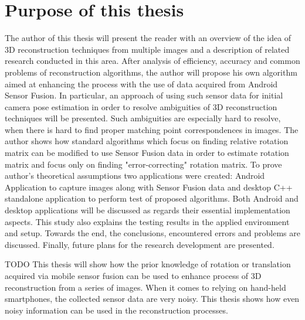 \section{Purpose of this thesis} %
The author of this thesis will present the reader with an overview of the idea of 3D reconstruction techniques from multiple images and a description of related research conducted in this area. After analysis of efficiency, accuracy and common problems of reconstruction algorithms, the author will propose his own algorithm aimed at enhancing the process with the use of data acquired from Android Sensor Fusion. In particular, an approach of using such sensor data for initial camera pose estimation in order to resolve ambiguities of 3D reconstruction techniques will be presented. Such ambiguities are especially hard to resolve, when there is hard to find proper matching point correspondences in images. The author shows how standard algorithms which focus on finding relative rotation matrix can be modified to use Sensor Fusion data in order to estimate rotation matrix and focus only on finding "error-correcting" rotation matrix. To prove author's theoretical assumptions two applications were created: Android Application to capture images along with Sensor Fusion data and desktop C++ standalone application to perform test of proposed algorithms. Both Android and desktop applications will be discussed as regards their essential implementation aspects. This study also explains the testing results in the applied environment and setup. Towards the end, the conclusions, encountered errors and problems are discussed. Finally, future plans for the research development are presented.

TODO 
This thesis will show how the prior knowledge of rotation or translation acquired via mobile sensor fusion can be used to enhance process of 3D reconstruction from a series of images. When it comes to relying on hand-held smartphones, the collected sensor data are very noisy. This thesis shows how even noisy information can be used in the reconstruction processes.
